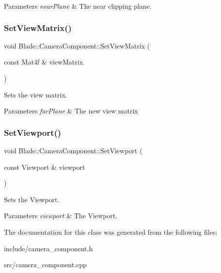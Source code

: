 \begin{DoxyParams}{Parameters}
{\em near\+Plane} & The near clipping plane. \\
\hline
\end{DoxyParams}
\mbox{\label{class_blade_1_1_camera_component_ad1972814c236509dd7fcc9525e068e46}} 
\subsubsection{\texorpdfstring{Set\+View\+Matrix()}{SetViewMatrix()}}
{\footnotesize\ttfamily void Blade\+::\+Camera\+Component\+::\+Set\+View\+Matrix (\begin{DoxyParamCaption}\item[{const Mat4f \&}]{view\+Matrix }\end{DoxyParamCaption})\hspace{0.3cm}{\ttfamily [noexcept]}}



Sets the view matrix. 


\begin{DoxyParams}{Parameters}
{\em far\+Plane} & The new view matrix \\
\hline
\end{DoxyParams}
\mbox{\label{class_blade_1_1_camera_component_a9270ae358568b454a760dccaafc1d0c1}} 
\subsubsection{\texorpdfstring{Set\+Viewport()}{SetViewport()}}
{\footnotesize\ttfamily void Blade\+::\+Camera\+Component\+::\+Set\+Viewport (\begin{DoxyParamCaption}\item[{const Viewport \&}]{viewport }\end{DoxyParamCaption})\hspace{0.3cm}{\ttfamily [noexcept]}}



Sets the Viewport. 


\begin{DoxyParams}{Parameters}
{\em viewport} & The Viewport. \\
\hline
\end{DoxyParams}


The documentation for this class was generated from the following files\+:\begin{DoxyCompactItemize}
\item 
include/camera\+\_\+component.\+h\item 
src/camera\+\_\+component.\+cpp\end{DoxyCompactItemize}
